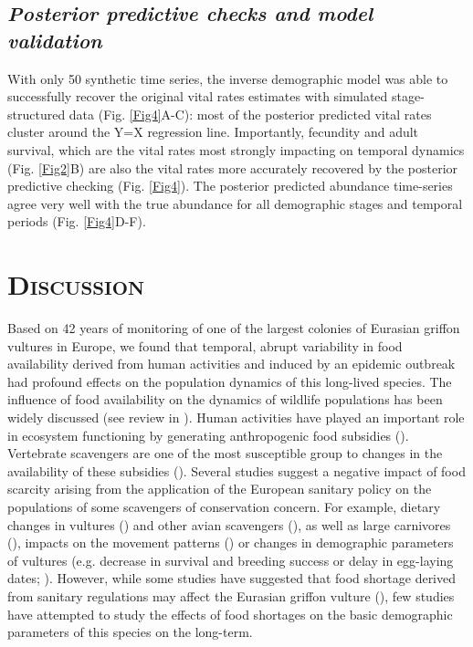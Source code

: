 \documentclass[12pt]{article}
\begin{document}
\subsection*{\textit{Posterior predictive checks and model validation}}
With only 50 synthetic time series, the inverse demographic model was able to successfully recover the original vital rates estimates with simulated stage-structured data (Fig. \ref{Fig4}A-C): most of the posterior predicted vital rates cluster around the Y=X regression line. Importantly, fecundity and adult survival, which are the vital rates most strongly impacting on temporal dynamics (Fig. \ref{Fig2}B) are also the vital rates more accurately recovered by the posterior predictive checking (Fig. \ref{Fig4}). The posterior predicted abundance time-series agree very well with the true abundance for all demographic stages and temporal periods (Fig. \ref{Fig4}D-F). \\


\section*{\textsc{Discussion}}

Based on 42 years of monitoring of one of the largest colonies of Eurasian griffon vultures in Europe, we found that temporal, abrupt variability in food availability derived from human activities and induced by an epidemic outbreak had profound effects on the population dynamics of this long-lived species. The influence of food availability on the dynamics of wildlife populations has been widely discussed (see review in \cite{Ostfeld2000}). Human activities have played an important role in ecosystem functioning by generating anthropogenic food subsidies (\cite{Oro2013}).  Vertebrate scavengers are one of the most susceptible group to changes in the availability of these subsidies (\cite{Cortes-Avizanda2016}). Several studies suggest a negative impact of food scarcity arising from the application of the European sanitary policy on the populations of some scavengers of conservation concern. For example, dietary changes in vultures (\cite{Donazar2010}) and other avian scavengers (\cite{Blanco2014}), as well as large carnivores (\cite{Lagos2015,Llaneza2015,Northrup2012}), impacts on the movement patterns (\cite{Arrondo2018}) or changes in demographic parameters of vultures (e.g. decrease in survival and breeding success or delay in egg-laying dates; \cite{Donazar2009b,Martinez-Abrain2012,Margalida2014a,Donazar2020}).  However, while some studies have suggested that food shortage derived from sanitary regulations may affect the Eurasian griffon vulture (\cite{Margalida2012}), few studies have attempted to study the effects of food shortages on the basic demographic parameters of this species on the long-term.\\
\end{document}
